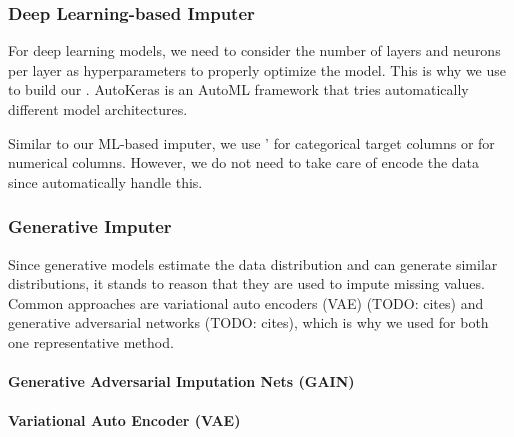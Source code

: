 \subsubsection{Deep Learning-based Imputer}
%
For deep learning models, we need to consider the number of layers and neurons per layer as hyperparameters to properly optimize the model. This is why we use \cite{AutoKeras} to build our . AutoKeras is an AutoML framework that tries automatically different model architectures.

Similar to our ML-based imputer, we use '  for categorical target columns or  for numerical columns. However, we do not need to take care of encode the data since  automatically handle this.


\subsubsection{Generative Imputer}
%
Since generative models estimate the data distribution and can generate similar distributions\cite{Generativ_survey}, it stands to reason that they are used to impute missing values. Common approaches are variational auto encoders (VAE) (TODO: cites) and generative adversarial networks (TODO: cites), which is why we used for both one representative method.

\paragraph{Generative Adversarial Imputation Nets (GAIN)}
%



\paragraph{Variational Auto Encoder (VAE)}
%

